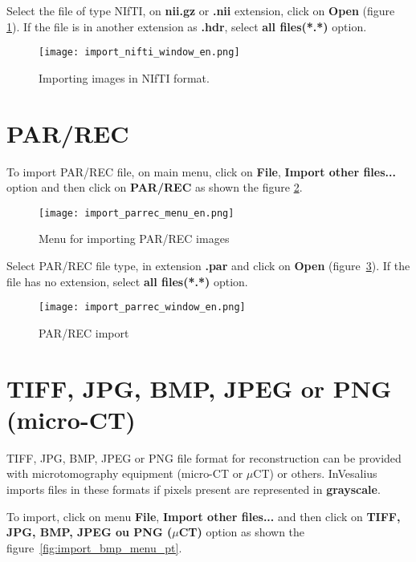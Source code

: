 Select the file of type NIfTI, on \textbf{nii.gz} or \textbf{.nii} extension, click on \textbf{Open} (figure \ref{fig:import_nifti_window_pt}). If the file is in another extension as \textbf{.hdr}, select \textbf{all files(*.*)} option.

\begin{figure}[!htb]
\centering
\texttt{[image: import\_nifti\_window\_en.png]}
\caption{Importing images in NIfTI format.}
\label{fig:import_nifti_window_pt}
\end{figure}

\section{PAR/REC}

To import PAR/REC file, on main menu, click on \textbf{File}, \textbf{Import other files...} option and then click on \textbf{PAR/REC} as shown the figure \ref{fig:import_parrec_menu_pt}.

\begin{figure}[!htb]
\centering
\texttt{[image: import\_parrec\_menu\_en.png]}
\caption{Menu for importing PAR/REC images}
\label{fig:import_parrec_menu_pt}
\end{figure}

Select PAR/REC file type, in extension \textbf{.par} and click on \textbf{Open} (figure~\ref{fig:import_parrec_window_pt}). If the file has no extension, select \textbf{all files(*.*)} option.

\begin{figure}[!htb]
\centering
\texttt{[image: import\_parrec\_window\_en.png]}
\caption{PAR/REC import}
\label{fig:import_parrec_window_pt}
\end{figure}

\section{TIFF, JPG, BMP, JPEG or PNG (micro-CT)}

TIFF, JPG, BMP, JPEG or PNG file format for reconstruction can be provided with microtomography equipment (micro-CT or $\mu$CT) or others. InVesalius imports files in these formats if pixels present are represented in \textbf{grayscale}.

To import, click on menu \textbf{File}, \textbf{Import other files...} and then click on \textbf{TIFF, JPG, BMP, JPEG ou PNG ($\mu$CT)} option as shown the figure~\ref{fig:import_bmp_menu_pt}.


